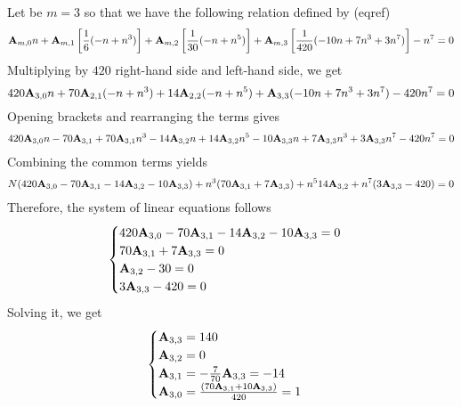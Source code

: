 \begin{examp}
    Let be $m=3$ so that we have the following relation defined by (eqref)
    \begin{equation*}
        {\mathbf{A}} \sb{m,0} n
        + {\mathbf{A}} \sb{m,1} \left[ \frac{1}{6} (-n + n^3) \right]
        + {\mathbf{A}} \sb{m,2} \left[ \frac{1}{30} (-n + n^5) \right]
        + {\mathbf{A}} \sb{m,3} \left[ \frac{1}{420} (-10 n + 7 n^3 + 3 n^7) \right] - n^7 = 0
    \end{equation*}
    Multiplying by $420$ right-hand side and left-hand side, we get
    \begin{equation*}
        420 {\mathbf{A}} \sb{3,0} n + 70 {\mathbf{A}} \sb{2,1} (-n + n^3) + 14 {\mathbf{A}} \sb{2,2} (-n + n^5) + {\mathbf{A}} \sb{3,3} (-10 n + 7 n^3 + 3 n^7) - 420n^7 = 0
    \end{equation*}
    Opening brackets and rearranging the terms gives
    \begin{equation*}
        \begin{split}
            420 {\mathbf{A}} \sb{3,0} n - 70 {\mathbf{A}} \sb{3,1} + 70 {\mathbf{A}} \sb{3,1} n^3 - 14 {\mathbf{A}} \sb{3,2} n + 14 {\mathbf{A}} \sb{3,2} n^5
            - 10 {\mathbf{A}} \sb{3,3} n + 7 {\mathbf{A}} \sb{3,3} n^3 + 3 {\mathbf{A}} \sb{3,3} n^7 - 420n^7 = 0
        \end{split}
    \end{equation*}
    Combining the common terms yields
    \begin{equation*}
        \begin{split}
            N (420 {\mathbf{A}} \sb{3,0} - 70 {\mathbf{A}} \sb{3,1} - 14 {\mathbf{A}} \sb{3,2} - 10 {\mathbf{A}} \sb{3,3})
            + n^3 (70 {\mathbf{A}} \sb{3,1} + 7 {\mathbf{A}} \sb{3,3})
            + n^5 14 {\mathbf{A}} \sb{3,2}
            + n^7 (3 {\mathbf{A}} \sb{3,3} - 420)
            = 0
        \end{split}
    \end{equation*}
    Therefore, the system of linear equations follows
    \begin{equation*}
        \begin{cases}
            420 {\mathbf{A}} \sb{3,0} - 70 {\mathbf{A}} \sb{3,1} - 14 {\mathbf{A}} \sb{3,2} - 10 {\mathbf{A}} \sb{3,3} = 0 \\
            70 {\mathbf{A}} \sb{3,1} + 7 {\mathbf{A}} \sb{3,3} = 0 \\
            {\mathbf{A}} \sb{3,2} - 30 = 0 \\
            3 {\mathbf{A}} \sb{3,3} - 420 = 0
        \end{cases}
    \end{equation*}
    Solving it, we get
    \begin{equation*}
        \begin{cases}
            {\mathbf{A}} \sb{3,3} = 140 \\
            {\mathbf{A}} \sb{3,2} = 0 \\
            {\mathbf{A}} \sb{3,1} = -\frac{7}{70} {\mathbf{A}} \sb{3,3} = -14 \\
            {\mathbf{A}} \sb{3,0} = \frac{(70 {\mathbf{A}} \sb{3,1} + 10 {\mathbf{A}} \sb{3,3})}{420} = 1
        \end{cases}
    \end{equation*}
\end{examp}